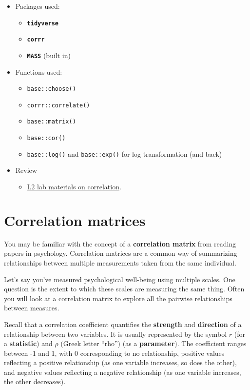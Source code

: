 \documentclass[]{book}
\providecommand{\tightlist}{%
  \setlength{\itemsep}{0pt}\setlength{\parskip}{0pt}}
\begin{document}
\begin{itemize}
\tightlist
\item
  Packages used:

  \begin{itemize}
  \tightlist
  \item
    \textbf{\texttt{tidyverse}}
  \item
    \textbf{\texttt{corrr}}
  \item
    \textbf{\texttt{MASS}} (built in)
  \end{itemize}
\item
  Functions used:

  \begin{itemize}
  \tightlist
  \item
    \texttt{base::choose()}
  \item
    \texttt{corrr::correlate()}
  \item
    \texttt{base::matrix()}
  \item
    \texttt{base::cor()}
  \item
    \texttt{base::log()} and \texttt{base::exp()} for log transformation (and back)
  \end{itemize}
\item
  Review

  \begin{itemize}
  \tightlist
  \item
    \href{https://psyteachr.github.io/ug2-practical/correlations.html}{L2 lab materials on correlation}.
  \end{itemize}
\end{itemize}

\hypertarget{correlation-matrices}{%
\section{Correlation matrices}\label{correlation-matrices}}

You may be familiar with the concept of a \textbf{correlation matrix} from reading papers in psychology. Correlation matrices are a common way of summarizing relationships between multiple measurements taken from the same individual.

Let's say you've measured psychological well-being using multiple scales. One question is the extent to which these scales are measuring the same thing. Often you will look at a correlation matrix to explore all the pairwise relationships between measures.

Recall that a correlation coefficient quantifies the \textbf{strength} and \textbf{direction} of a relationship between two variables. It is usually represented by the symbol \(r\) (for a \textbf{statistic}) and \(\rho\) (Greek letter ``rho'') (as a \textbf{parameter}). The coefficient ranges between -1 and 1, with 0 corresponding to no relationship, positive values reflecting a positive relationship (as one variable increases, so does the other), and negative values reflecting a negative relationship (as one variable increases, the other decreases).
\end{document}
